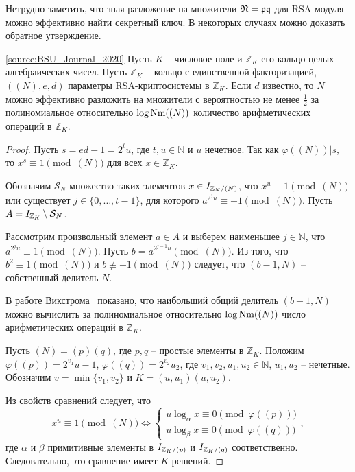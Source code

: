 \documentclass[_00_dissertation.tex]{subfiles}
\begin{document}
Нетрудно заметить, что зная разложение на множители $\mathfrak{N}=\mathfrak{p}\mathfrak{q}$ для RSA-модуля можно эффективно найти секретный ключ.
В некоторых случаях можно доказать обратное утверждение.

\begin{theorem}\label{theorem:factor}\ref{source:BSU_Journal_2020}
    Пусть $K$ -- числовое поле и $\mathbb{Z}_K$ его кольцо целых алгебраических чисел.
    Пусть $\mathbb{Z}_K$ -- кольцо с единственной факторизацией, $((N), e, d)$ параметры RSA-криптосистемы в $\mathbb{Z}_K$.
    Если $d$ известно, то $N$ можно эффективно разложить на множители с вероятностью не менее $\frac{1}{2}$ за полиномиальное относительно $\log \textrm{Nm}((N))$ количество арифметических операций в $\mathbb{Z}_K$.
\end{theorem}
\begin{proof}
    Пусть $s = ed - 1 = 2^t u$, где $t, u \in \mathbb{N}$ и $u$ нечетное.
    Так как $\varphi((N)) | s$, то $x^s \equiv 1 \pmod{(N)}$ для всех $x \in \mathbb{Z}_K$.
    
    Обозначим $\mathcal{S}_N$ множество таких элементов $x \in I_{\mathbb{Z}_N / (N)}$, что $x^u \equiv 1 \pmod{(N)}$ или существует $j \in \{0, \dots, t-1\}$, для которого $a^{2^j u} \equiv -1 \pmod{(N)}$.
    Пусть $A = I_{\mathbb{Z}_K} \setminus \mathcal{S}_N$.
    
    Рассмотрим произвольный элемент $a \in A$ и выберем наименьшее $j \in \mathbb{N}$, что $a^{2^j u} \equiv 1 \pmod{(N)}$.
    Пусть $b = a^{2^{j-1} u} \pmod{(N)}$.
    Из того, что $b^2 \equiv 1 \pmod{(N)}$ и $b \not\equiv \pm 1 \pmod{(N)}$ следует, что $(b - 1, N)$ -- собственный делитель $N$.
    
    В работе Викстрома~\cite{source:Wikstrom} показано, что наибольший общий делитель $(b - 1, N)$ можно вычислить за полиномиальное относительно $\log \textrm{Nm}((N))$ число арифметических операций в $\mathbb{Z}_K$.
    
    Пусть $(N) = (p)(q)$, где $p, q$ -- простые элементы в $\mathbb{Z}_K$.
    Положим $\varphi((p)) = 2^{v_1} u-1$, $\varphi((q)) = 2^{v_2} u_2$, где $v_1, v_2, u_1, u_2 \in \mathbb{N}$, $u_1, u_2$ -- нечетные.
    Обозначим $v = \min\{v_1, v_2\}$ и $K = (u, u_1)(u, u_2)$.
    
    Из свойств сравнений следует, что
    \begin{equation*}
        x^u \equiv 1 \pmod{(N)}
        \Leftrightarrow
        \begin{cases}
            u \log_{\alpha} x \equiv 0 \pmod{\varphi((p))}\\
            u \log_{\beta} x \equiv 0 \pmod{\varphi((q))}
        \end{cases},
    \end{equation*}
    где $\alpha$ и $\beta$ примитивные элементы в $I_{\mathbb{Z}_K / (p)}$ и $I_{\mathbb{Z}_K / (q)}$ соответственно.
    Следовательно, это сравнение имеет $K$ решений.
    

\end{proof}
\end{document}
